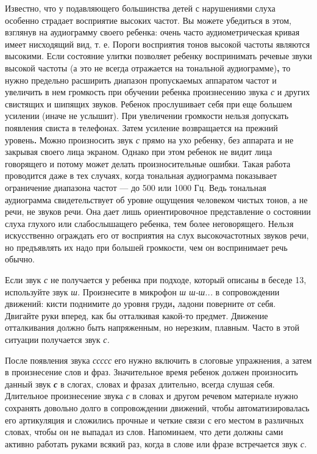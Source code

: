 \documentclass{book}
\renewcommand{\emph}[1]{\textit{#1}}
\begin{document}
Известно, что у подавляющего большинства детей с нарушениями слуха
особенно страдает восприятие высоких частот. Вы можете убедиться в этом,
взглянув на аудиограмму своего ребенка: очень часто аудиометрическая
кривая имеет нисходящий вид, т. е. Пороги восприятия тонов высокой
частоты являются высокими. Если состояние улитки позволяет ребенку
воспринимать речевые звуки высокой частоты (а это не всегда отражается
на тональной аудиограмме)\textbf{,} то нужно предельно расширить
диапазон пропускаемых аппаратом частот и увеличить в нем громкость при
обучении ребенка произнесению звука \emph{с} и других свистящих и
шипящих звуков. Ребенок прослушивает себя при еще большем усилении
(иначе не услышит). При увеличении громкости нельзя допускать появления
свиста в телефонах. Затем усиление возвращается на прежний
уровень\textbf{.} Можно произносить звук \emph{с} прямо на ухо ребенку,
без аппарата и не закрывая своего лица экраном. Однако при этом ребенок
не видит лица говорящего и потому может делать произносительные ошибки.
Такая работа проводится даже в тех случаях, когда тональная аудиограмма
показывает ограничение диапазона частот --- до 500 или 1000 Гц. Ведь
тональная аудиограмма свидетельствует об уровне ощущения человеком
чистых тонов, а не речи, не звуков речи. Она дает лишь ориентировочное
представление о состоянии слуха глухого или слабослышащего ребенка, тем
более неговорящего. Нельзя искусственно ограждать его от восприятия на
слух высокочастотных звуков речи, но предъявлять их надо при большей
громкости, чем он воспринимает речь обычно.

Если звук \emph{с} не получается у ребенка при подходе, который описаны
в беседе 13, используйте звук \emph{ш.} Произнесите в микрофон \emph{ш
ш-ш...} в сопровождении движений: кисти поднимите до уровня
груди\textbf{,} ладони поверните от себя. Двигайте руки вперед, как бы
отталкивая какой-то предмет. Движение отталкивания должно быть
напряженным, но нерезким, плавным. Часто в этой ситуации получается звук
\emph{с.}

После появления звука \emph{ссссс} его нужно включить в слоговые
упражнения, а затем в произнесение слов и фраз. Значительное время
ребенок должен произносить данный звук \emph{\textbf{с}} в слогах,
словах и фразах длительно, всегда слушая себя. Длительное произнесение
звука \emph{с} в словах и другом речевом материале нужно сохранять
довольно долго в сопровождении движений, чтобы автоматизировалась его
артикуляция и сложились прочные и четкие связи с его местом в различных
словах, чтобы он не выпадал из слов. Напоминаем, что дети должны сами
активно работать руками всякий раз, когда в слове или фразе встречается
звук \emph{с.}
\end{document}
